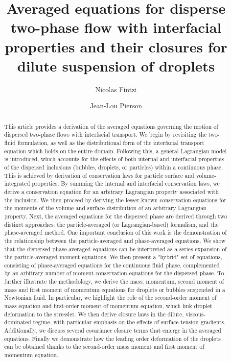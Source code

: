 \documentclass[11pt]{My_preprint}
\title{Averaged equations for disperse two-phase flow with interfacial properties and their closures for dilute suspension of droplets}
\author[1,2]{Nicolas Fintzi}
\author[1]{Jean-Lou Pierson}
\affil[1]{IFP Energies Nouvelles, Rond-point de l'echangeur de Solaize, 69360 Solaize}
\affil[2]{Sorbonne Universit\'e, Institut Jean le Rond $\partial$'Alembert, 4 place Jussieu, 75252 PARIS CEDEX 05, France}
\begin{document}
\maketitle

\begin{abstract}
This article provides a derivation of the averaged equations governing the motion of dispersed two-phase flows with interfacial transport. 
We begin by revisiting the two-fluid formulation, as well as the distributional form of the interfacial transport equation which holds on the entire domain. 
Following this, a general Lagrangian model is introduced, which accounts for the effects of both internal and interfacial properties of the dispersed inclusions (bubbles, droplets, or particles) within a continuous phase.
This is achieved by derivation of conservation laws for particle surface and volume-integrated properties. 
By summing the internal and interfacial conservation laws, we derive a conservation equation for an arbitrary Lagrangian property associated with the inclusion. 
We then proceed by deriving the lesser-known conservation equations for the moments of the volume and surface distribution of an arbitrary Lagrangian property.  
Next, the averaged equations for the dispersed phase are derived through two distinct approaches: the particle-averaged (or Lagrangian-based) formalism, and the phase-averaged method. 
One important conclusion of this work is the demonstration of the relationship between the particle-averaged and phase-averaged equations. 
We show that the dispersed phase-averaged equations can be interpreted as a series expansion of the particle-averaged moment equations. 
We then present a "hybrid" set of equations, consisting of phase-averaged equations for the continuous fluid phase, complemented by an arbitrary number of moment conservation equations for the dispersed phase.
To further illustrate the methodology, we derive the mass, momentum, second moment of mass and first moment of momentum equations for droplets or bubbles suspended in a Newtonian fluid. 
In particular, we highlight the role of the second-order moment of mass equation and first-order moment of momentum equation, which link droplet deformation to the stresslet. 
We then derive closure laws in the dilute, viscous-dominated regime, with particular emphasis on the effects of surface tension gradients.
Additionally, we discuss several covariance closure terms that emerge in the averaged equations. 
Finally we demonstrate how the leading order deformation of the droplets can be obtained thanks to the second-order mass moment and first moment of momentum equation.
\end{abstract}
\end{document}
